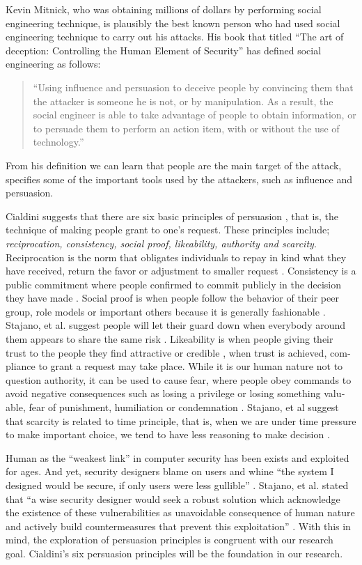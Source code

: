 Kevin Mitnick, who was obtaining millions of dollars by performing
social engineering technique, is plausibly the best known person who
had used social engineering technique to carry out his attacks. His
book that titled ``The art of deception: Controlling the Human Element
of Security'' \citep{mitnik:2001} has defined social engineering
as follows:
\begin{quote}
``Using influence and persuasion to deceive people by convincing
them that the attacker is someone he is not, or by manipulation. As
a result, the social engineer is able to take advantage of people
to obtain information, or to persuade them to perform an action item,
with or without the use of technology.''
\end{quote}
From his definition we can learn that people are the main target of
the attack, specifies some of the important tools used by the attackers,
such as influence and persuasion. 

Cialdini suggests that there are six basic principles of persuasion
\citep{cialdini:2001}, that is, the technique of making people grant
to one's request. These principles include;\textit{ reciprocation,
consistency, social proof, likeability, authority and scarcity}. Reciprocation
is \foreignlanguage{english}{the norm that obligates individuals to
repay in kind what they have received, return the favor or adjustment
to smaller request \citep{cialdini:2001}. Consistency is a public
commitment where people confirmed to commit publicly in the decision
they have made \citep{workman:2008}\citep{cialdini:2001}. Social
proof is when people follow the behavior of their peer group, role
models or important others because it is generally \textquotedbl{}fashionable\textquotedbl{}
\citep{workman:2008}. Stajano, et al. suggest people will let their
guard down when everybody around them appears to share the same risk
\citep{stajano2011understanding}. Likeability is when people giving
their trust to the people they find attractive or credible \citep{workman:2008,cialdini:2001},
when trust is achieved, compliance to grant a request may take place.
While it is our human nature not to question authority, it can be
used to cause fear, where people obey commands to avoid negative consequences
such as losing a privilege or losing something valuable, fear of punishment,
humiliation or condemnation \citep{cialdini:2001,workman:2008}. Stajano,
et al suggest that scarcity is related to time principle, that is,
when we are under time pressure to make important choice, we tend
to have less reasoning to make decision \citep{stajano2011understanding}. }

Human as the ``weakest link'' in computer security has been exists
and exploited for ages. And yet, security designers blame on users
and whine ``the system I designed would be secure, if only users
were less gullible'' \citep{stajano2011understanding}. Stajano,
et al. stated that ``a wise security designer would seek a robust
solution which acknowledge the existence of these vulnerabilities
as unavoidable consequence of human nature and actively build countermeasures
that prevent this exploitation'' \citep{stajano2011understanding}.
With this in mind, the exploration of persuasion principles is congruent
with our research goal. Cialdini's six persuasion principles will
be the foundation in our research.
